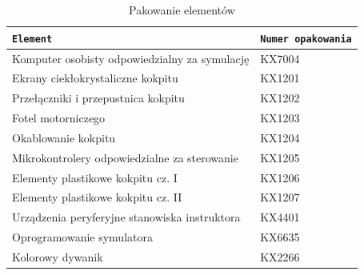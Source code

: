 \documentclass[12pt,a4paper]{article}
\begin{document}
\begin{table}[h]
\caption{Pakowanie elementów}
	\begin{center}
\begin{tabular}{l|l}
\texttt{Element} & \texttt{Numer opakowania} \\ \hline
Komputer osobisty odpowiedzialny za symulację & KX7004 \\
Ekrany ciekłokrystaliczne kokpitu & KX1201 \\
Przełączniki i przepustnica kokpitu& KX1202 \\
Fotel motorniczego & KX1203 \\
Okablowanie kokpitu & KX1204 \\
Mikrokontrolery odpowiedzialne za sterowanie & KX1205 \\
Elementy plastikowe kokpitu cz. I & KX1206 \\
Elementy plastikowe kokpitu cz. II & KX1207 \\
Urządzenia peryferyjne stanowiska instruktora & KX4401 \\
Oprogramowanie symulatora & KX6635 \\
Kolorowy dywanik & KX2266
\end{tabular}
\label{elem}
\end{center}
\end{table}
\end{document}
